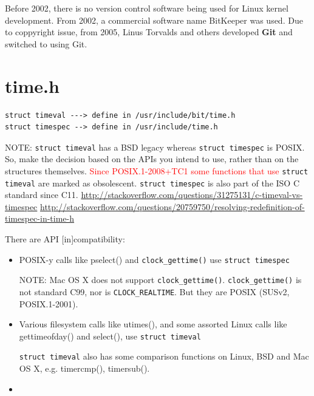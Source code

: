 Before 2002, there is no version control software being used for Linux kernel
development. From 2002, a commercial software name BitKeeper was used. Due to
coppyright issue, from 2005, Linus Torvalds and others developed {\bf Git} and
switched to using Git.



\section{time.h}
\label{sec:time.h}

\begin{verbatim}
struct timeval ---> define in /usr/include/bit/time.h
struct timespec --> define in /usr/include/time.h
\end{verbatim}
NOTE: \verb!struct timeval! has a BSD legacy whereas \verb!struct timespec! is
POSIX. So, make the decision based on the APIs you intend to use, rather than on
the structures themselves.
\textcolor{red}{Since POSIX.1-2008+TC1 some functions that use} 
\verb!struct timeval! are marked as obsolescent. \verb!struct timespec! is also part of the ISO C standard since C11.
\url{http://stackoverflow.com/questions/31275131/c-timeval-vs-timespec}
\url{http://stackoverflow.com/questions/20759750/resolving-redefinition-of-timespec-in-time-h}

There are API [in]compatibility:
\begin{itemize} 
  \item  POSIX-y calls like pselect() and \verb!clock_gettime()! use 
  \verb!struct timespec!
  
NOTE: Mac OS X does not support \verb!clock_gettime()!.
\verb!clock_gettime()! is not standard C99, nor is \verb!CLOCK_REALTIME!. But
they are POSIX (SUSv2, POSIX.1-2001).

  \item Various filesystem calls like utimes(), 
  and some assorted Linux calls like gettimeofday() and select(), use 
  \verb!struct timeval!

\verb!struct timeval! also has some comparison functions on Linux, BSD and Mac
OS X, e.g. timercmp(), timersub().

  \item
\end{itemize}



